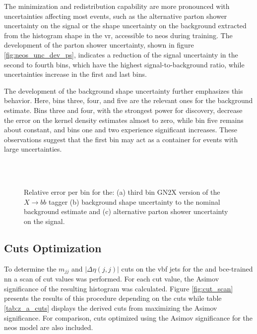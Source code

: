 The minimization and redistribution capability are more pronounced with uncertainties affecting most events, such as the alternative parton shower uncertainty on the signal or the shape uncertainty on the background extracted from the histogram shape in the \ac{vr}, accessible to \ac{neos} during training. The development of the parton shower uncertainty, shown in figure \ref{fig:neos_unc_dev_ps}, indicates a reduction of the signal uncertainty in the second to fourth bins, which have the highest signal-to-background ratio, while uncertainties increase in the first and last bins.


The development of the background shape uncertainty further emphasizes this behavior. Here, bins three, four, and five are the relevant ones for the background estimate. Bins three and four, with the strongest power for discovery, decrease the error on the kernel density estimates almost to zero, while bin five remains about constant, and bins one and two experience significant increases. These observations suggest that the first bin may act as a container for events with large uncertainties.




\begin{figure}
    \centering
    \\
    \\     \label{fig:neos_unc_dev_ps}
         \label{fig:neos_unc_dev_bkg_shape_sys}
    \caption[]{Relative error per bin for the: (a) third \pt bin GN2X version of the $X\rightarrow bb$ tagger (b) background shape uncertainty to the nominal background estimate and (c) alternative parton shower uncertainty on the signal.}
    \label{fig:neos_unc_dev}
\end{figure}

\subsection{Cuts Optimization}
To determine the $m_{jj}$ and $|\Delta\eta(j,j)|$ cuts on the \ac{vbf} jets  for the \mhh and \ac{bce}-trained \ac{nn} a scan of cut values was performed. For each cut value, the Asimov significance of the resulting histogram was calculated. Figure \ref{fig:cut_scan} presents the results of this procedure depending on the cuts while table \ref{tab:z_a_cuts} displays the derived cuts from maximizing the Asimov significance. For comparison, cuts optimized using the Asimov significance for the \ac{neos} model are also included.

